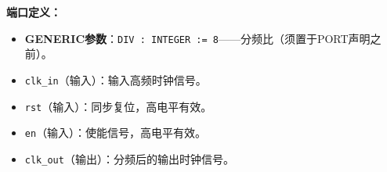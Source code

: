 \vspace{0.3cm}

\textbf{端口定义：}
\begin{itemize}
  \item \textbf{GENERIC参数}：\texttt{DIV : INTEGER := 8}——分频比（须置于PORT声明之前）。
  \item \texttt{clk\_in}（输入）：输入高频时钟信号。
  \item \texttt{rst}（输入）：同步复位，高电平有效。
  \item \texttt{en}（输入）：使能信号，高电平有效。
  \item \texttt{clk\_out}（输出）：分频后的输出时钟信号。
\end{itemize}

\vspace{0.3cm}

